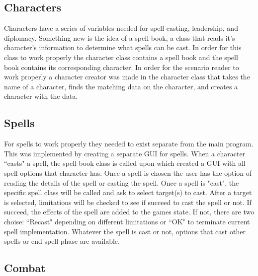 \documentclass[12pt,a4paper]{article}
\begin{document}
\subsection{Characters}
Characters have a series of variables needed for spell casting, leadership, and 
diplomacy. Something new is the idea of a spell book, a class that reads it's 
character's information to determine what spells can be cast. In order for this
class to work properly the character class contains a spell book and the spell
book contains its corresponding character. In order for the scenario reader to 
work properly a character creator was made in the character class that takes the
name of a character, finds the matching data on the character, and creates a 
character with the data.

\subsection{Spells}
For spells to work properly they needed to exist separate from the main program.
This was implemented by creating a separate GUI for spells. When a character 
``casts" a spell, the spell book class is called upon which created a GUI with 
all spell options that character has. Once a spell is chosen the user has the 
option of reading the details of the spell or casting the spell. 
\newline
\newline
Once a spell is "cast", the specific spell class will be called and ask to select target(s) to cast. After a target is selected, limitations will be checked to see if succeed to cast the spell or not. If succeed, the effects of the spell are added to the games state. If not, there are two choise: ``Recast" depending on different limitations or ``OK" to terminate current spell implementation. Whatever the spell is cast or not, options that cast other spells or end spell phase are available.

\subsection{Combat}
\end{document}
